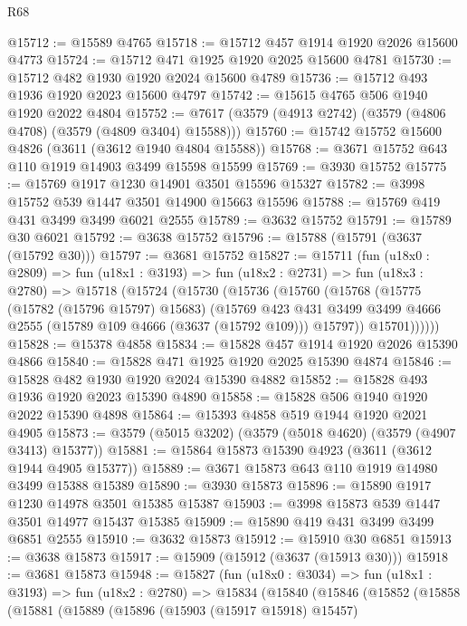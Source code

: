 \begin{lexlean}{R68}
\begin{coremodule}
@15712 := @15589 @4765
@15718 := @15712 @457 @1914 @1920 @2026 @15600 @4773
@15724 := @15712 @471 @1925 @1920 @2025 @15600 @4781
@15730 := @15712 @482 @1930 @1920 @2024 @15600 @4789
@15736 := @15712 @493 @1936 @1920 @2023 @15600 @4797
@15742 := @15615 @4765 @506 @1940 @1920 @2022 @4804
@15752 := @7617 (@3579 (@4913 @2742) (@3579 (@4806 @4708) (@3579 (@4809 @3404) @15588)))
@15760 := @15742 @15752 @15600 @4826 (@3611 (@3612 @1940 @4804 @15588))
@15768 := @3671 @15752 @643 @110 @1919 @14903 @3499 @15598 @15599
@15769 := @3930 @15752
@15775 := @15769 @1917 @1230 @14901 @3501 @15596 @15327
@15782 := @3998 @15752 @539 @1447 @3501 @14900 @15663 @15596
@15788 := @15769 @419 @431 @3499 @3499 @6021 @2555
@15789 := @3632 @15752
@15791 := @15789 @30 @6021
@15792 := @3638 @15752
@15796 := @15788 (@15791 (@3637 (@15792 @30)))
@15797 := @3681 @15752
@15827 := @15711
    (fun (u18x0 : @2809) =>
    fun (u18x1 : @3193) =>
    fun (u18x2 : @2731) =>
    fun (u18x3 : @2780) =>
    @15718
      (@15724
        (@15730
          (@15736
            (@15760
              (@15768
                (@15775
                  (@15782 (@15796 @15797) @15683)
                  (@15769
                    @423
                    @431
                    @3499
                    @3499
                    @4666
                    @2555
                    (@15789 @109 @4666 (@3637 (@15792 @109)))
                    @15797))
                @15701))))))
@15828 := @15378 @4858
@15834 := @15828 @457 @1914 @1920 @2026 @15390 @4866
@15840 := @15828 @471 @1925 @1920 @2025 @15390 @4874
@15846 := @15828 @482 @1930 @1920 @2024 @15390 @4882
@15852 := @15828 @493 @1936 @1920 @2023 @15390 @4890
@15858 := @15828 @506 @1940 @1920 @2022 @15390 @4898
@15864 := @15393 @4858 @519 @1944 @1920 @2021 @4905
@15873 := @3579 (@5015 @3202) (@3579 (@5018 @4620) (@3579 (@4907 @3413) @15377))
@15881 := @15864 @15873 @15390 @4923 (@3611 (@3612 @1944 @4905 @15377))
@15889 := @3671 @15873 @643 @110 @1919 @14980 @3499 @15388 @15389
@15890 := @3930 @15873
@15896 := @15890 @1917 @1230 @14978 @3501 @15385 @15387
@15903 := @3998 @15873 @539 @1447 @3501 @14977 @15437 @15385
@15909 := @15890 @419 @431 @3499 @3499 @6851 @2555
@15910 := @3632 @15873
@15912 := @15910 @30 @6851
@15913 := @3638 @15873
@15917 := @15909 (@15912 (@3637 (@15913 @30)))
@15918 := @3681 @15873
@15948 := @15827
    (fun (u18x0 : @3034) =>
    fun (u18x1 : @3193) =>
    fun (u18x2 : @2780) =>
    @15834
      (@15840
        (@15846
          (@15852
            (@15858
              (@15881
                (@15889
                  (@15896
                    (@15903 (@15917 @15918) @15457)

\end{coremodule}
\end{lexlean}
